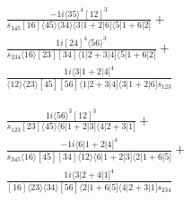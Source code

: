 \documentclass[varwidth, border=5pt]{standalone}
\begin{document}
\begin{my}
$\begin{gathered}
\scriptscriptstyle\frac{-1i\langle35\rangle^4[12]^3}{s_{345}[16]\langle45\rangle\langle34\rangle\langle3|1+2|6]\langle5|1+6|2]}+\\
\scriptscriptstyle\frac{1i[24]^4\langle56\rangle^3}{s_{234}\langle16\rangle[23][34]\langle1|2+3|4]\langle5|1+6|2]}+\\
\scriptscriptstyle\frac{1i\langle3|1+2|4]^4}{\langle12\rangle\langle23\rangle[45][56]\langle1|2+3|4]\langle3|1+2|6]s_{123}}\phantom{+}
\end{gathered}$
\end{my}
\begin{my}
$\begin{gathered}
\scriptscriptstyle\frac{1i\langle56\rangle^3[12]^3}{s_{123}[23]\langle45\rangle\langle6|1+2|3]\langle4|2+3|1]}+\\
\scriptscriptstyle\frac{-1i\langle6|1+2|4]^4}{s_{345}\langle16\rangle[45][34]\langle12\rangle\langle6|1+2|3]\langle2|1+6|5]}+\\
\scriptscriptstyle\frac{1i\langle3|2+4|1]^4}{[16]\langle23\rangle\langle34\rangle[56]\langle2|1+6|5]\langle4|2+3|1]s_{234}}\phantom{+}
\end{gathered}$
\end{my}
\end{document}
